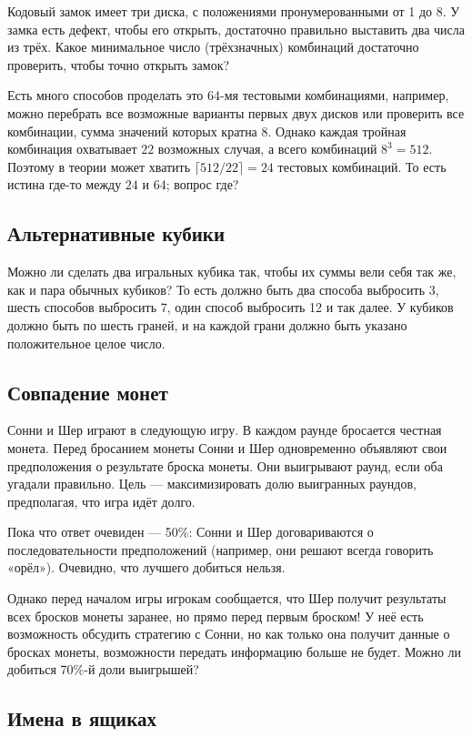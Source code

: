Кодовый замок имеет три диска, с положениями пронумерованными от 1 до 8.
У замка есть дефект, чтобы его открыть, достаточно правильно выставить два числа из трёх.
Какое минимальное число (трёхзначных) комбинаций достаточно проверить, чтобы точно открыть замок?

Есть много способов проделать это $64$-мя тестовыми комбинациями, например, можно перебрать все возможные варианты первых двух дисков или проверить все комбинации, сумма значений которых кратна 8.
Однако каждая тройная комбинация охватывает $22$ возможных случая, а всего комбинаций $8^3 = 512$. 
Поэтому в теории может хватить $\lceil 512/22 \rceil = 24$ тестовых комбинаций.
То есть истина где-то между $24$ и $64$; вопрос где?

\subsection*{Альтернативные кубики}

Можно ли сделать два игральных кубика так, чтобы их суммы вели себя так же, как и пара обычных кубиков?
То есть должно быть два способа выбросить 3, шесть способов выбросить 7, один способ выбросить 12 и так далее.
У кубиков должно быть по шесть граней, и на каждой грани должно быть указано положительное целое число.

\subsection*{Совпадение монет}

Сонни и Шер играют в следующую игру.
В каждом раунде бросается честная монета.
Перед бросанием монеты Сонни и Шер одновременно объявляют свои предположения о результате броска монеты.
Они выигрывают раунд, если оба угадали правильно.
Цель --- максимизировать долю выигранных раундов, предполагая, что игра идёт долго.

Пока что ответ очевиден --- 50\%: Сонни и Шер договариваются о последовательности предположений (например, они решают всегда говорить «орёл»).
Очевидно, что лучшего добиться нельзя.

Однако перед началом игры игрокам сообщается, что Шер получит результаты всех бросков монеты заранее, но прямо перед первым броском!
У неё есть возможность обсудить стратегию с Сонни, но как только она получит данные о бросках монеты, возможности передать информацию больше не будет.
Можно ли добиться 70\%-й доли выигрышей?

\subsection*{Имена в ящиках}\label{Имена в ящиках}

